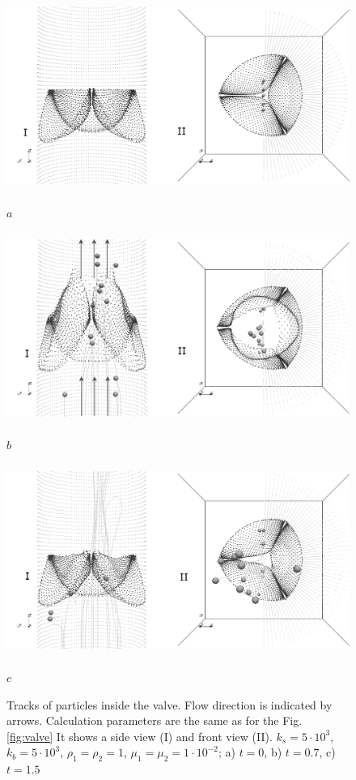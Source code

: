 \documentclass[runningheads,a4paper]{llncs}
\begin{document}
\begin{figure}
\centering
\includegraphics[height=6.2cm]{images/valve_with_particles_1_gray.png}

$a$

\includegraphics[height=6.2cm]{images/valve_with_particles_2_gray.png}

$b$

\includegraphics[height=6.2cm]{images/valve_with_particles_3_gray.png}

$c$

\caption{Tracks of particles inside the valve. Flow direction is indicated by arrows. Calculation parameters are the same as for the Fig. \ref{fig:valve}
It shows a side view (I) and front view (II). $k_s = 5 \cdot 10^3$, $k_b = 5 \cdot 10^3$, $\rho_1 = \rho_2 = 1$,
$\mu_1 = \mu_2 = 1 \cdot 10^{-2}$; a) $t=0$, b) $t=0.7$, c) $t=1.5$}

\label{fig:valve_with_particles}
\end{figure}
\end{document}
